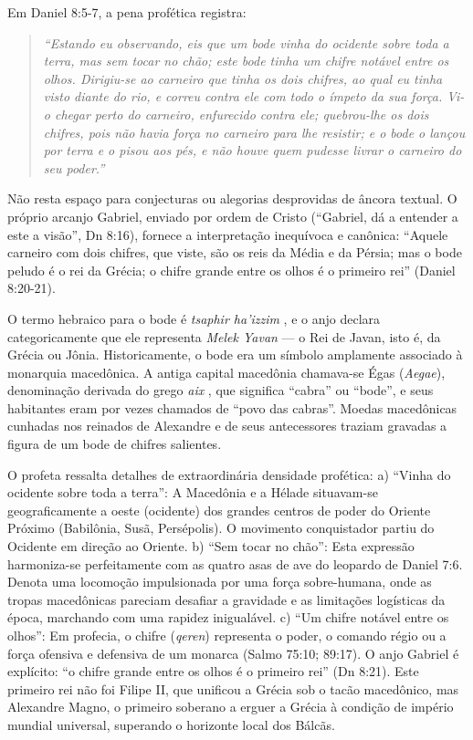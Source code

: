 \documentclass[11pt,a4paper,openany]{book}
\begin{document}
Em Daniel 8:5-7, a pena profética registra:

\begin{quote}
\itshape ``Estando eu observando, eis que um bode vinha do ocidente sobre toda a terra, mas sem tocar no chão; este bode tinha um chifre notável entre os olhos. Dirigiu-se ao carneiro que tinha os dois chifres, ao qual eu tinha visto diante do rio, e correu contra ele com todo o ímpeto da sua força. Vi-o chegar perto do carneiro, enfurecido contra ele; quebrou-lhe os dois chifres, pois não havia força no carneiro para lhe resistir; e o bode o lançou por terra e o pisou aos pés, e não houve quem pudesse livrar o carneiro do seu poder.''
\end{quote}


Não resta espaço para conjecturas ou alegorias desprovidas de âncora textual. O próprio arcanjo Gabriel, enviado por ordem de Cristo (``Gabriel, dá a entender a este a visão'', Dn 8:16), fornece a interpretação inequívoca e canônica:
``Aquele carneiro com dois chifres, que viste, são os reis da Média e da Pérsia; mas o bode peludo é o rei da Grécia; o chifre grande entre os olhos é o primeiro rei'' (Daniel 8:20-21).

O termo hebraico para o bode é \textit{tsaphir ha'izzim} , e o anjo declara categoricamente que ele representa \textit{Melek Yavan} — o Rei de Javan, isto é, da Grécia ou Jônia. Historicamente, o bode era um símbolo amplamente associado à monarquia macedônica. A antiga capital macedônia chamava-se Égas (\textit{Aegae}), denominação derivada do grego \textit{aix} , que significa ``cabra'' ou ``bode'', e seus habitantes eram por vezes chamados de ``povo das cabras''. Moedas macedônicas cunhadas nos reinados de Alexandre e de seus antecessores traziam gravadas a figura de um bode de chifres salientes.

O profeta ressalta detalhes de extraordinária densidade profética:
a) ``Vinha do ocidente sobre toda a terra'': A Macedônia e a Hélade situavam-se geograficamente a oeste (ocidente) dos grandes centros de poder do Oriente Próximo (Babilônia, Susã, Persépolis). O movimento conquistador partiu do Ocidente em direção ao Oriente.
b) ``Sem tocar no chão'': Esta expressão harmoniza-se perfeitamente com as quatro asas de ave do leopardo de Daniel 7:6. Denota uma locomoção impulsionada por uma força sobre-humana, onde as tropas macedônicas pareciam desafiar a gravidade e as limitações logísticas da época, marchando com uma rapidez inigualável.
c) ``Um chifre notável entre os olhos'': Em profecia, o chifre (\textit{qeren}) representa o poder, o comando régio ou a força ofensiva e defensiva de um monarca (Salmo 75:10; 89:17). O anjo Gabriel é explícito: ``o chifre grande entre os olhos é o primeiro rei'' (Dn 8:21). Este primeiro rei não foi Filipe II, que unificou a Grécia sob o tacão macedônico, mas Alexandre Magno, o primeiro soberano a erguer a Grécia à condição de império mundial universal, superando o horizonte local dos Bálcãs.
\end{document}
